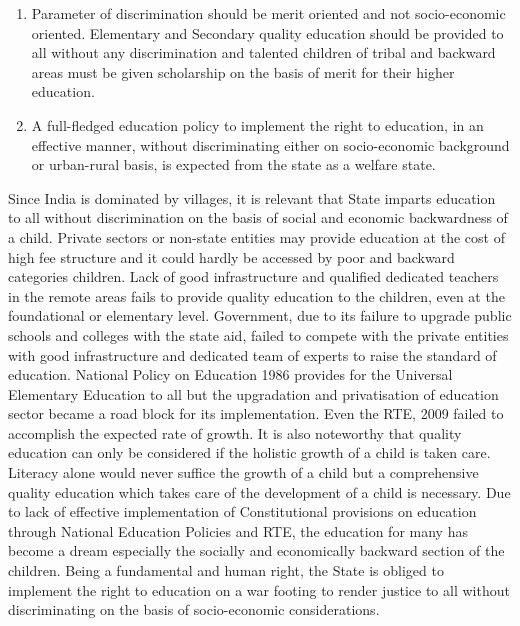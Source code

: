 \begin{multicols}{2}
\begin{enumerate}[label=$-$]
\item Parameter of discrimination should be merit oriented and not socio-economic
oriented. Elementary and Secondary quality education should be provided to all
without any discrimination and talented children of tribal and backward areas
must be given scholarship on the basis of merit for their higher education.

\item A full-fledged education policy to implement the right to education, in an
effective manner, without discriminating either on socio-economic background or
urban-rural basis, is expected from the state as a welfare state.
\end{enumerate}

\vspace{-.25cm}


\vspace{-.1cm}

\noi
Since India is dominated by villages, it is relevant that State imparts education to all without
discrimination on the basis of social and economic backwardness of a child. Private sectors or
non-state entities may provide education at the cost of high fee structure and it could hardly
be accessed by poor and backward categories children. Lack of good infrastructure and qualified
dedicated teachers in the remote areas fails to provide quality education to the children, even
at the foundational or elementary level. Government, due to its failure to upgrade public
schools and colleges with the state aid, failed to compete with the private entities with good
infrastructure and dedicated team of experts to raise the standard of education. National
Policy on Education 1986 provides for the Universal Elementary Education to all but the upgradation and privatisation of education sector became a road block for its implementation.
Even the RTE, 2009 failed to accomplish the expected rate of growth. It is also noteworthy
that quality education can only be considered if the holistic growth of a child is taken care.
Literacy alone would never suffice the growth of a child but a comprehensive quality
education which takes care of the development of a child is necessary. Due to lack of
effective implementation of Constitutional provisions on education through National Education Policies and RTE, the education for many has become a dream especially the
socially and economically backward section of the children. Being a fundamental and human
right, the State is obliged to implement the right to education on a war footing to render
justice to all without discriminating on the basis of socio-economic considerations.

\end{multicols}
\label{end2019-art2}
